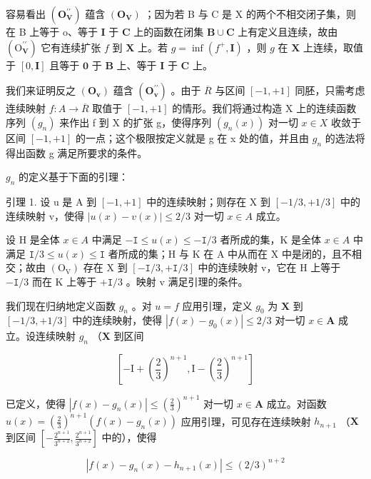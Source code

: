 容易看出 \((\mathbf{O}_{\mathbf{V}}^{\prime\prime})\) 蕴含 \((\mathbf{O}_{\mathbf{V}})\) ；因为若 B 与 C 是 X 的两个不相交闭子集，则在 B 上等于 o、等于 \(\mathbf{I}\) 于 \(\mathbf{C}\) 上的函数在闭集 \(\mathbf{B} \cup \mathbf{C}\) 上有定义且连续，故由 \((\mathrm{O}_{\mathbf{V}}^{\prime \prime})\) 它有连续扩张 \(f\) 到 \(\mathbf{X}\) 上。若 \(g = \inf (f^{+}, \mathbf{I})\) ，则 \(g\) 在 \(\mathbf{X}\) 上连续，取值于 \([0, \mathbf{I}]\) 且等于 \(\mathbf{0}\) 于 \(\mathbf{B}\) 上、等于 \(\mathbf{I}\) 于 \(\mathbf{C}\) 上。

我们来证明反之 \((\mathbf{O}_{\mathbf{v}})\) 蕴含 \((\mathbf{O}_{\mathbf{v}}^{\prime\prime})\) 。由于 \(\overline{R}\) 与区间 \([-1, +1]\) 同胚，只需考虑连续映射 \(f: A \to \overline{R}\) 取值于 \([-1, +1]\) 的情形。我们将通过构造 X 上的连续函数序列 \((g_{n})\) 来作出 f 到 X 的扩张 g，使得序列 \((g_{n}(x))\) 对一切 \(x \in X\) 收敛于区间 \([-1, +1]\) 的一点；这个极限按定义就是 g 在 x 处的值，并且由 \(g_{n}\) 的选法将得出函数 g 满足所要求的条件。

\(g_{n}\) 的定义基于下面的引理：

引理 1. 设 u 是 A 到 \([-1, +1]\) 中的连续映射；则存在 X 到 \([-1/3, +1/3]\) 中的连续映射 v，使得 \(|u(x) - v(x)| \leqslant 2/3\) 对一切 \(x \in A\) 成立。

设 H 是全体 \(x \in A\) 中满足 \(-\mathtt{I} \leqslant u(x) \leqslant -\mathtt{I}/3\) 者所成的集，K 是全体 \(x \in A\) 中满足 \(\mathtt{I}/3 \leqslant u(x) \leqslant \mathtt{I}\) 者所成的集；H 与 K 在 A 中从而在 X 中是闭的，且不相交；故由 \((\mathrm{O}_{\mathrm{V}})\) 存在 X 到 \([-\mathtt{I}/3, +\mathtt{I}/3]\) 中的连续映射 v，它在 H 上等于 \(-\mathtt{I}/3\) 而在 K 上等于 \(+\mathtt{I}/3\) 。映射 v 满足引理的条件。

我们现在归纳地定义函数 \(g_n\) 。对 \(u = f\) 应用引理，定义 \(g_0\) 为 \(\mathbf{X}\) 到 \([-1/3, +1/3]\) 中的连续映射，使得 \(|f(x) - g_0(x)| \leqslant 2/3\) 对一切 \(x \in \mathbf{A}\) 成立。设连续映射 \(g_n\) （\(\mathbf{X}\) 到区间

\[
[ - \mathrm{I} + (\frac {2}{3}) ^ {n + 1}, \mathrm{I} - (\frac {2}{3}) ^ {n + 1} ]
\]

已定义，使得 \(|f(x) - g_n(x)| \leqslant (\frac{2}{3})^{n+1}\) 对一切 \(x \in \mathbf{A}\) 成立。对函数 \(u(x) = (\frac{2}{3})^{n+1} (f(x) - g_n(x))\) 应用引理，可见存在连续映射 \(h_{n+1}\) （\(\mathbf{X}\) 到区间 \(\left[-\frac{2^{n+1}}{3^{n+2}}, \frac{2^{n+1}}{3^{n+2}}\right]\) 中的），使得

\[
\left| f (x) - g _ {n} (x) - h _ {n + 1} (x) \right| \leqslant (2 / 3) ^ {n + 2}
\]

